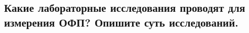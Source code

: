 

\subsection{Какие лабораторные исследования проводят для измерения ОФП? Опишите суть исследований.}

